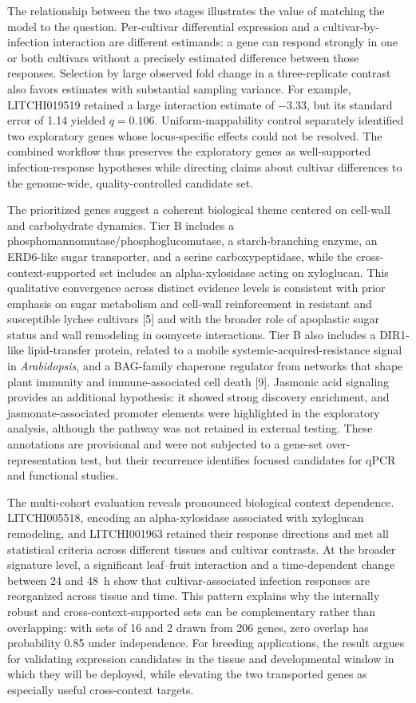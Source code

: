 \documentclass[11pt]{article}
\newcommand{\q}{\textit{q}}
\begin{document}
The relationship between the two stages illustrates the value of matching the model to the question. Per-cultivar differential expression and a cultivar-by-infection interaction are different estimands: a gene can respond strongly in one or both cultivars without a precisely estimated difference between those responses. Selection by large observed fold change in a three-replicate contrast also favors estimates with substantial sampling variance. For example, LITCHI019519 retained a large interaction estimate of $-3.33$, but its standard error of 1.14 yielded $\q=0.106$. Uniform-mappability control separately identified two exploratory genes whose locus-specific effects could not be resolved. The combined workflow thus preserves the exploratory genes as well-supported infection-response hypotheses while directing claims about cultivar differences to the genome-wide, quality-controlled candidate set.

The prioritized genes suggest a coherent biological theme centered on cell-wall and carbohydrate dynamics. Tier B includes a phosphomannomutase/phosphoglucomutase, a starch-branching enzyme, an ERD6-like sugar transporter, and a serine carboxypeptidase, while the cross-context-supported set includes an alpha-xylosidase acting on xyloglucan. This qualitative convergence across distinct evidence levels is consistent with prior emphasis on sugar metabolism and cell-wall reinforcement in resistant and susceptible lychee cultivars [5] and with the broader role of apoplastic sugar status and wall remodeling in oomycete interactions. Tier B also includes a DIR1-like lipid-transfer protein, related to a mobile systemic-acquired-resistance signal in \textit{Arabidopsis}, and a BAG-family chaperone regulator from networks that shape plant immunity and immune-associated cell death [9]. Jasmonic acid signaling provides an additional hypothesis: it showed strong discovery enrichment, and jasmonate-associated promoter elements were highlighted in the exploratory analysis, although the pathway was not retained in external testing. These annotations are provisional and were not subjected to a gene-set over-representation test, but their recurrence identifies focused candidates for qPCR and functional studies.

The multi-cohort evaluation reveals pronounced biological context dependence. LITCHI005518, encoding an alpha-xylosidase associated with xyloglucan remodeling, and LITCHI001963 retained their response directions and met all statistical criteria across different tissues and cultivar contrasts. At the broader signature level, a significant leaf--fruit interaction and a time-dependent change between 24 and 48~h show that cultivar-associated infection responses are reorganized across tissue and time. This pattern explains why the internally robust and cross-context-supported sets can be complementary rather than overlapping: with sets of 16 and 2 drawn from 206 genes, zero overlap has probability 0.85 under independence. For breeding applications, the result argues for validating expression candidates in the tissue and developmental window in which they will be deployed, while elevating the two transported genes as especially useful cross-context targets.
\end{document}
